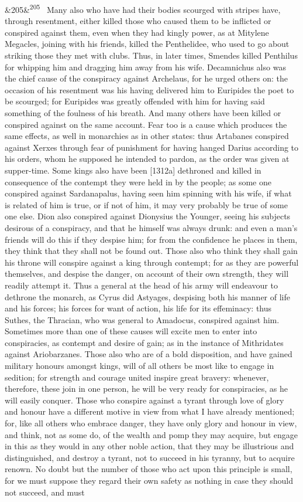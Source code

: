 \documentclass[12pt]{article}
\newcommand{\para}[1][]{\par\noindent\ifx&#1&\else\textsuperscript{\footnotesize #1}~\fi}
\begin{document}
\para[205] Many also who have had their bodies scourged with stripes have, through resentment, either killed those who caused them to be inflicted or conspired against them, even when they had kingly power, as at Mitylene Megacles, joining with his friends, killed the Penthelidee, who used to go about striking those they met with clubs. Thus, in later times, Smendes killed Penthilus for whipping him and dragging him away from his wife. Decamnichus also was the chief cause of the conspiracy against Archelaus, for he urged others on: the occasion of his resentment was his having delivered him to Euripides the poet to be scourged; for Euripides was greatly offended with him for having said something of the foulness of his breath. And many others have been killed or conspired against on the same account. Fear too is a cause which produces the same effects, as well in monarchies as in other states: thus Artabanes conspired against Xerxes through fear of punishment for having hanged Darius according to his orders, whom he supposed he intended to pardon, as the order was given at supper-time. Some kings also have been [1312a] dethroned and killed in consequence of the contempt they were held in by the people; as some one conspired against Sardanapalus, having seen him spinning with his wife, if what is related of him is true, or if not of him, it may very probably be true of some one else. Dion also conspired against Dionysius the Younger, seeing his subjects desirous of a conspiracy, and that he himself was always drunk: and even a man's friends will do this if they despise him; for from the confidence he places in them, they think that they shall not be found out. Those also who think they shall gain his throne will conspire against a king through contempt; for as they are powerful themselves, and despise the danger, on account of their own strength, they will readily attempt it. Thus a general at the head of his army will endeavour to dethrone the monarch, as Cyrus did Astyages, despising both his manner of life and his forces; his forces for want of action, his life for its effeminacy: thus Suthes, the Thracian, who was general to Amadocus, conspired against him. Sometimes more than one of these causes will excite men to enter into conspiracies, as contempt and desire of gain; as in the instance of Mithridates against Ariobarzanes. Those also who are of a bold disposition, and have gained military honours amongst kings, will of all others be most like to engage in sedition; for strength and courage united inspire great bravery: whenever, therefore, these join in one person, he will be very ready for conspiracies, as he will easily conquer. Those who conspire against a tyrant through love of glory and honour have a different motive in view from what I have already mentioned; for, like all others who embrace danger, they have only glory and honour in view, and think, not as some do, of the wealth and pomp they may acquire, but engage in this as they would in any other noble action, that they may be illustrious and distinguished, and destroy a tyrant, not to succeed in his tyranny, but to acquire renown. No doubt but the number of those who act upon this principle is small, for we must suppose they regard their own safety as nothing in case they should not succeed, and must 
\end{document}

